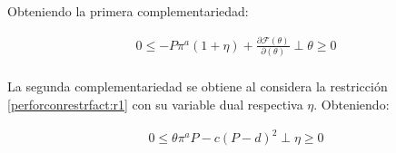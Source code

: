 Obteniendo la primera complementariedad:

\begin{equation}
\begin{array}{rrclcl}
    0\leq -P\pi^a(1+\eta)+\frac{\partial\mathcal{F}(\theta)}{\partial(\theta)} \perp \theta \geq 0 \label{compllag3}\\
\end{array}
\end{equation}

La segunda complementariedad se obtiene al considera la restricción \ref{perforconrestrfact:r1} con su variable dual respectiva $\eta$. Obteniendo:

\begin{equation}
\begin{array}{rrclcl}
    0 \leq \theta \pi^a P - c(P-d)^2 \perp \eta \geq 0 \label{compllag3}\\
\end{array}
\end{equation}



